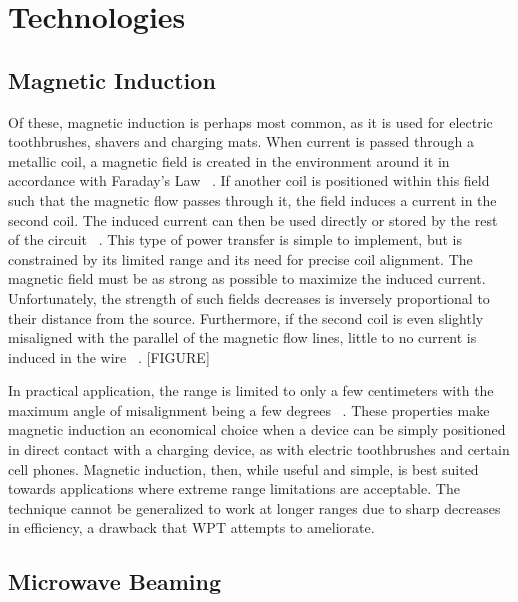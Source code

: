 \section{Technologies}
\label{sec:lit-review-tech}

\subsection{Magnetic Induction}
Of these, magnetic induction is perhaps most common, as it is used for electric toothbrushes, shavers and charging mats. When current is passed through a metallic coil, a magnetic field is created in the environment around it in accordance with Faraday’s Law ~\cite{smith_waves_2010}. If another coil is positioned within this field such that the magnetic flow passes through it, the field induces a current in the second coil. The induced current can then be used directly or stored by the rest of the circuit ~\cite{smith_waves_2010}. This type of power transfer is simple to implement, but is constrained by its limited range and its need for precise coil alignment. The magnetic field must be as strong as possible to maximize the induced current. Unfortunately, the strength of such fields decreases is inversely proportional to their distance from the source. Furthermore, if the second coil is even slightly misaligned with the parallel of the magnetic flow lines, little to no current is induced in the wire ~\cite{griffiths_david_introduction_1999}.
[FIGURE]

In practical application, the range is limited to only a few centimeters with the maximum angle of misalignment being a few degrees ~\cite{butler_tour_2013}. These properties make magnetic induction an economical choice when a device can be simply positioned in direct contact with a charging device, as with electric toothbrushes and certain cell phones. Magnetic induction, then, while useful and simple, is best suited towards applications where extreme range limitations are acceptable. The technique cannot be generalized to work at longer ranges due to sharp decreases in efficiency, a drawback that WPT attempts to ameliorate.

\subsection{Microwave Beaming}

